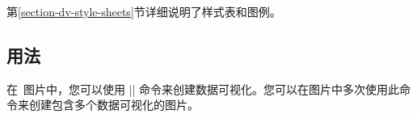 
第\ref{section-dv-style-sheets}节详细说明了样式表和图例。

\subsection{用法}
\label{section-dv-data-syntax}


在\tikzname\ 图片中，您可以使用 |\datavisualization| 命令来创建数据可视化。您可以在图片中多次使用此命令来创建包含多个数据可视化的图片。

